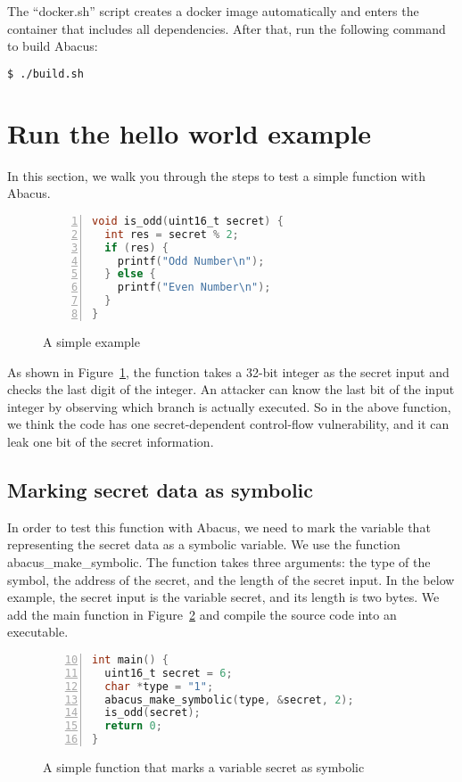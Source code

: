\documentclass[10pt,conference]{IEEEtran}
\newcommand{\tool}{\textsf{Abacus}}
\begin{document}
The ``docker.sh'' script creates a docker image automatically and enters the container that includes all dependencies. After that, run the following command to build \tool{}:

\begin{lstlisting}[language=bash]
$ ./build.sh
\end{lstlisting}
\section{Run the hello world example}
In this section, we walk you through the steps to test a simple function with \tool{}.

\begin{figure}[h]
\begin{lstlisting}[xleftmargin=.07\textwidth, xrightmargin=.07\textwidth,numbers=left, frame=single, language=C]
void is_odd(uint16_t secret) {
  int res = secret % 2;        
  if (res) {             
    printf("Odd Number\n");
  } else {
    printf("Even Number\n");
  }
}
\end{lstlisting}
\caption{A simple example}
\label{fig:example0}
\end{figure}

As shown in Figure~\ref{fig:example0}, the function takes a 32-bit integer as the secret input and checks the last digit of the integer. An attacker can know the last bit of the input integer by observing which branch is actually executed. So in the above function, we think the code has one secret-dependent control-flow vulnerability, and it can leak one bit of the secret information.

\subsection{Marking secret data as symbolic}
In order to test this function with \tool{}, we need to mark the variable that representing the secret data as a symbolic variable. We use the function \textsf{abacus\_make\_symbolic}. The function takes three arguments: the type of the symbol, the address of the secret, and the length of the secret input. In the below example, the secret input is the variable \textsf{secret}, and its length is two bytes. We add the \textsf{main} function in Figure~\ref{fig:example1} and compile the source code into an executable.

\begin{figure}[h]
\begin{lstlisting}[firstnumber=10, xleftmargin=.07\textwidth, xrightmargin=.07\textwidth, numbers=left, frame=single, language=C]
int main() {
  uint16_t secret = 6;
  char *type = "1";
  abacus_make_symbolic(type, &secret, 2); 
  is_odd(secret);
  return 0;
}
\end{lstlisting}
\caption{A simple function that marks a variable \textsf{secret} as symbolic}
\label{fig:example1}
\end{figure}
\end{document}
